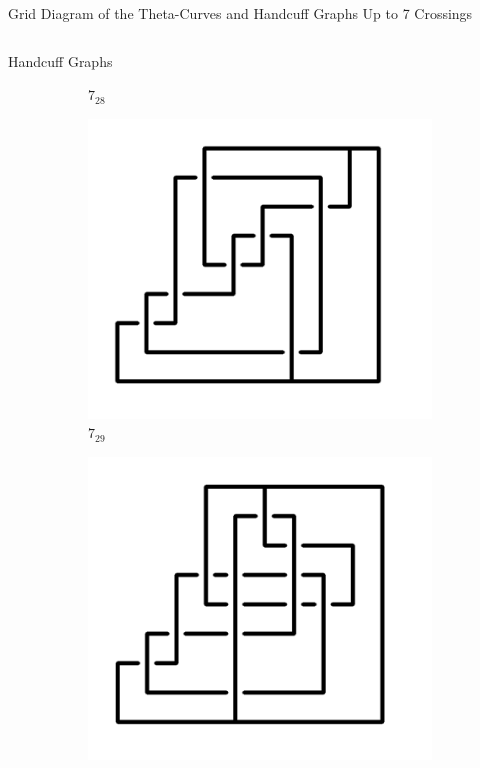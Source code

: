 \documentclass[final]{beamer}
\begin{document}
\begin{frame}[t]
\begin{alertblock}{Grid Diagram of the Theta-Curves and Handcuff Graphs Up to 7 Crossings}
\begin{columns}[t]
\begin{column}{0.5\textwidth}
\begin{alertblock}{Handcuff Graphs}
\begin{figure}
\begin{subfigure}{0.075\textwidth}
    \caption{$7_{28}$} 
    \end{subfigure}
    \begin{subfigure}{0.075\textwidth}
    \includegraphics[width=\columnwidth]{../Midterm_Poster/grid_diagram/handcuff_7_29.png}
    \caption{$7_{29}$} 
    \end{subfigure}
    \begin{subfigure}{0.075\textwidth}
    \includegraphics[width=\columnwidth]{../Midterm_Poster/grid_diagram/handcuff_7_30.png}

\end{subfigure}
\end{figure}
\end{alertblock}
\end{column}
\end{columns}
\end{alertblock}
\end{frame}
\end{document}
